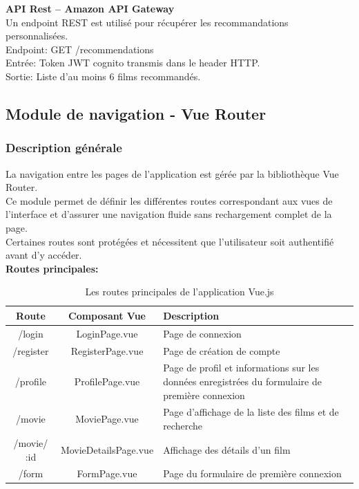 \documentclass[a4paper,12pt]{report}
\begin{document}
\textbf{API Rest – Amazon API Gateway}\\
Un endpoint REST est utilisé pour récupérer les recommandations personnalisées.\\
Endpoint: GET /recommendations\\
Entrée: Token JWT cognito transmis dans le header HTTP.\\
Sortie: Liste d’au moins 6 films recommandés.\\

\subsection{Module de navigation - Vue Router}
\label{vr}
\subsubsection{Description générale}
La navigation entre les pages de l’application est gérée par la bibliothèque Vue Router.\\
Ce module permet de définir les différentes routes correspondant aux vues de l’interface et d’assurer une navigation fluide sans rechargement complet de la page.\\
Certaines routes sont protégées et nécessitent que l’utilisateur soit authentifié avant d’y accéder.\\
\textbf{Routes principales:}
\begin{table}[htbp]
    \centering
    \begin{tabular}{c|c|p{8cm}}
    \hline
    \textbf{Route} & \textbf{Composant Vue} & \textbf{Description} \\ \hline
    /login & LoginPage.vue & Page de connexion \\ \hline
    /register & RegisterPage.vue & Page de création de compte \\ \hline
    /profile & ProfilePage.vue & Page de profil et informations sur les données enregistrées du formulaire de première connexion \\ \hline
    /movie & MoviePage.vue & Page d’affichage de la liste des films et de recherche \\ \hline
    /movie/ :id & MovieDetailsPage.vue & Affichage des détails d’un film \\ \hline
    /form & FormPage.vue & Page du formulaire de première connexion \\ \hline
    \end{tabular}
    \caption{Les routes principales de l'application Vue.js}
\end{table}
\end{document}
